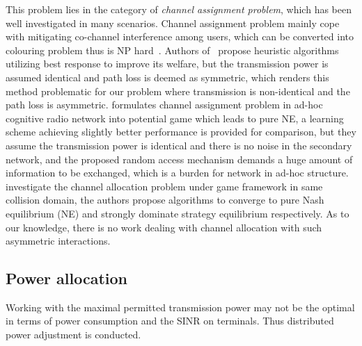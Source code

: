 This problem lies in the category of \textit{channel assignment problem}, which has been well investigated in many scenarios.
Channel assignment problem mainly cope with mitigating co-channel interference among users, which can be converted into colouring problem thus is NP hard~\cite{Hyacinth}. 
Authors of~\cite{Ko_DistributedCA} propose heuristic algorithms utilizing best response to improve its welfare, but the transmission power is assumed identical and path loss is deemed as symmetric, which renders this method problematic for our problem where transmission is non-identical and the path loss is asymmetric.
\cite{CApotentialLearning_05dyspan} formulates channel assignment problem in ad-hoc cognitive radio network into potential game which leads to pure NE, a learning scheme achieving slightly better performance is provided for comparison, but they assume the transmission power is identical and there is no noise in the secondary network, and the proposed random access mechanism demands a huge amount of information to be exchanged, which is a burden for network in ad-hoc structure.
\cite{CA_Felegyhazi_07infocom, Wu_GOP_CA_08infocom} investigate the channel allocation problem under game framework in same collision domain, the authors propose algorithms to converge to pure Nash equilibrium (NE) and strongly dominate strategy equilibrium respectively. 
As to our knowledge, there is no work dealing with channel allocation with such asymmetric interactions. 

\subsection{Power allocation}
\label{PA}
Working with the maximal permitted transmission power may not be the optimal in terms of power consumption and the SINR on terminals.
Thus distributed power adjustment is conducted.

